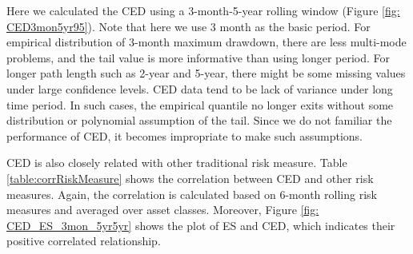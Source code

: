 Here we calculated the CED using a 3-month-5-year rolling window (Figure \ref{fig: CED3mon5yr95}).  Note that here we use 3 month as the basic period. For empirical distribution of 3-month maximum drawdown, there are less multi-mode problems, and the tail value is more informative than using longer period. For longer path length such as 2-year and 5-year, there might be some missing values under large confidence levels. CED data tend to be lack of variance under long time period. In such cases, the empirical quantile no longer exits without some distribution or polynomial assumption of the tail. Since we do not familiar the performance of CED, it becomes impropriate to make such assumptions. 

CED is also closely related with other traditional risk measure. Table \ref{table:corrRiskMeasure} shows the correlation between CED and other risk measures. Again, the correlation is calculated based on 6-month rolling risk measures and averaged over asset classes. Moreover, Figure \ref{fig: CED_ES_3mon_5yr5yr} shows the plot of ES and CED, which indicates their positive correlated relationship.


